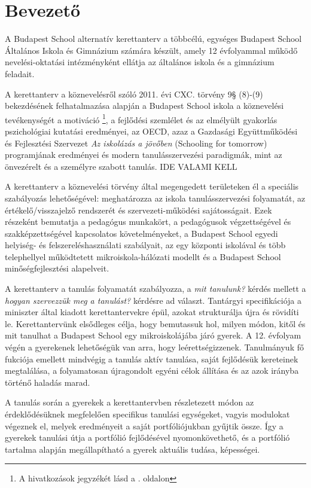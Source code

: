 \chapter{Bevezető}
A Budapest School alternatív kerettanterv a többcélú, egységes  Budapest School Általános Iskola és Gimnázium számára készült, amely 12 évfolyammal működő nevelési-oktatási intézményként ellátja az általános iskola és a gimnázium feladait.

A kerettanterv a köznevelésről szóló 2011. évi CXC. törvény 9§ (8)-(9) bekezdésének felhatalmazása alapján a Budapest School iskola a köznevelési tevékenységét a motiváció \citep{pink2011drive}\footnote{A hivatkozások jegyzékét lásd a \pageref{sec:bibliographyk}. oldalon}, a fejlődési szemlélet \citep{growthmindset} és az elmélyült gyakorlás \citep{ericsson2016peak}  pszichológiai kutatási eredményei, az  OECD, azaz a Gazdasági Együttműködési és Fejlesztési Szervezet \emph{Az iskolázás a jövőben}  (Schooling for tomorrow) programjának eredményei \citep{2006schooling}
és modern tanulásszervezési paradigmák, mint az önvezérelt \citep{mitra2012beyond} és a személyre szabott \citep{khan2012one} tanulás. IDE VALAMI KELL

A kerettanterv a köznevelési törvény által megengedett területeken él a speciális szabályozás lehetőségével: meghatározza az iskola tanulásszervezési folyamatát, az értékelő/visszajelző rendszerét és szervezeti-működési sajátosságait. Ezek részeként bemutatja a pedagógus munkakört, a pedagógusok végzettségével és szakképzettségével kapcsolatos követelményeket, a Budapest School  egyedi helyiség- és felszereléshasználati szabályait, az egy központi iskolával és több telephellyel működtetett mikroiskola-hálózati modellt és a Budapest School minőségfejlesztési alapelveit.

A kerettanterv  a tanulás folyamatát szabályozza, a \emph{mit tanulunk?} kérdés mellett a \emph{hogyan szervezzük meg a tanulást?} kérdésre ad választ. Tantárgyi specifikációja a miniszter által kiadott kerettantervekre \citep{ofi:kerettanterv} épül, azokat strukturálja újra és rövidíti le. Kerettantervünk elsődleges célja, hogy bemutassuk hol, milyen módon, kitől és mit tanulhat a Budapest School egy mikroiskolájába járó gyerek. A 12. évfolyam végén a gyerekenek lehetőségük van arra, hogy leérettségizzenek. Tanulmányuk fő fukciója emellett mindvégig a tanulás aktív tanulása, saját fejlődésük kereteinek megtalálása, a folyamatosan újragondolt egyéni célok állítása és az azok irányba történő haladás marad.

A tanulás során a gyerekek a kerettantervben részletezett módon az érdeklődésüknek megfelelően specifikus tanulási egységeket, vagyis modulokat végeznek el, melyek eredményeit a saját portfóliójukban gyűjtik össze. Így a gyerekek tanulási útja a portfólió fejlődésével nyomonkövethető, és a portfólió tartalma alapján megállapítható a gyerek aktuális tudása, képességei.

